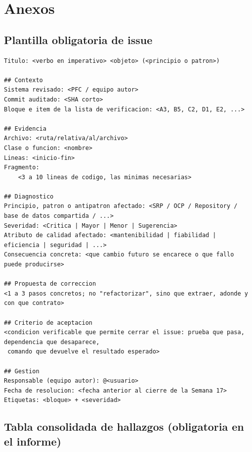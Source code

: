 \documentclass[11pt,a4paper]{article}
\begin{document}
\clearpage
\appendix
\section*{Anexos}
\renewcommand{\thesubsection}{\Alph{subsection}}
\setcounter{subsection}{0}

\subsection{Plantilla obligatoria de issue}

\begin{lstlisting}
Titulo: <verbo en imperativo> <objeto> (<principio o patron>)

## Contexto
Sistema revisado: <PFC / equipo autor>
Commit auditado: <SHA corto>
Bloque e item de la lista de verificacion: <A3, B5, C2, D1, E2, ...>

## Evidencia
Archivo: <ruta/relativa/al/archivo>
Clase o funcion: <nombre>
Lineas: <inicio-fin>
Fragmento:
    <3 a 10 lineas de codigo, las minimas necesarias>

## Diagnostico
Principio, patron o antipatron afectado: <SRP / OCP / Repository / base de datos compartida / ...>
Severidad: <Critica | Mayor | Menor | Sugerencia>
Atributo de calidad afectado: <mantenibilidad | fiabilidad | eficiencia | seguridad | ...>
Consecuencia concreta: <que cambio futuro se encarece o que fallo puede producirse>

## Propuesta de correccion
<1 a 3 pasos concretos; no "refactorizar", sino que extraer, adonde y con que contrato>

## Criterio de aceptacion
<condicion verificable que permite cerrar el issue: prueba que pasa, dependencia que desaparece,
 comando que devuelve el resultado esperado>

## Gestion
Responsable (equipo autor): @<usuario>
Fecha de resolucion: <fecha anterior al cierre de la Semana 17>
Etiquetas: <bloque> + <severidad>
\end{lstlisting}

\subsection{Tabla consolidada de hallazgos (obligatoria en el informe)}
\end{document}

